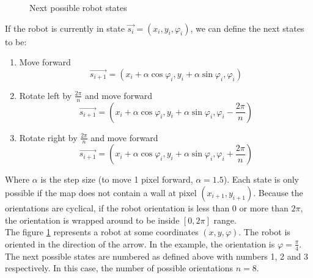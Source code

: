 \documentclass[12pt,a4paper]{article}
\begin{document}
	\begin{figure}[H]
		\centering
		
		\caption{Next possible robot states}
		\label{fig:next_robot_states}
	\end{figure}
	
	If the robot is currently in state $\vec{s_i} = (x_i, y_i, \varphi_i)$, we can define the next states to be:
	
	\begin{enumerate}
		\item Move forward
		$$\vec{s_{i+1}} = (x_i + \alpha \cos \varphi_i, y_i + \alpha \sin \varphi_i, \varphi_i)$$
		\item Rotate left by $\frac{2\pi}{n}$ and move forward
		$$\vec{s_{i+1}} = (x_i + \alpha \cos \varphi_i, y_i + \alpha \sin \varphi_i, \varphi_i - \frac{2\pi}{n})$$
		\item Rotate right by $\frac{2\pi}{n}$ and move forward
		$$\vec{s_{i+1}} = (x_i + \alpha \cos \varphi_i, y_i + \alpha \sin \varphi_i, \varphi_i + \frac{2\pi}{n})$$
	\end{enumerate}
	
	Where $\alpha$ is the step size (to move 1 pixel forward, $\alpha = 1.5$). Each state is only possible if the map does not contain a wall at pixel $(x_{i+1}, y_{i+1})$. Because the orientations are cyclical, if the robot orientation is less than $0$ or more than $2\pi$, the orientation is wrapped around to be inside $[0, 2\pi]$ range. \\
	
	The figure \ref{fig:next_robot_states} represents a robot at some coordinates $(x, y, \varphi)$. The robot is oriented in the direction of the arrow. In the example, the orientation is $\varphi = \frac{\pi}{4}$. The next possible states are numbered as defined above with numbers 1, 2 and 3 respectively. In this case, the number of possible orientations $n = 8$. \\
	
\end{document}
